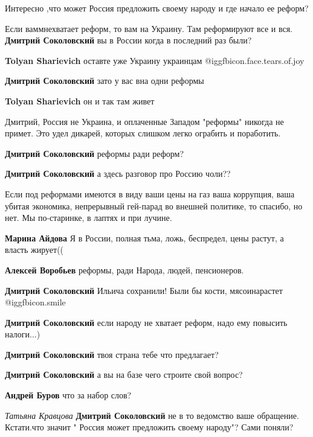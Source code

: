 \begin{itemize} %
Интересно ,что может Россия предложить своему народу и где начало ее реформ?

\begin{itemize} %
Если ваммнехватает реформ, то вам на Украину. Там реформируют все и вся.
\textbf{Дмитрий Соколовский} вы в России когда в последний раз были?

\textbf{Tolyan Sharievich} оставте уже Украину украинцам @igg{fbicon.face.tears.of.joy} 

\textbf{Дмитрий Соколовский} зато у вас вна одни реформы

\textbf{Tolyan Sharievich} он и так там живет

Дмитрий, Россия не Украина, и оплаченные Западом "реформы" никогда не примет. Это удел дикарей, которых слишком легко ограбить и поработить.

\textbf{Дмитрий Соколовский} реформы ради реформ?

\textbf{Дмитрий Соколовский} а здесь разговор про Россию чоли??


Если под реформами имеются в виду ваши цены на газ ваша коррупция, ваша убитая
экономика, непрерывный гей-парад во внешней политике, то спасибо, но нет. Мы
по-старинке, в лаптях и при лучине.

\textbf{Марина Айдова} Я в России, полная тьма, ложь, беспредел, цены растут, а власть жирует((

\textbf{Алексей Воробьев} реформы, ради Народа, людей, пенсионеров.

\textbf{Дмитрий Соколовский} Ильича сохранили!
Были бы кости, мясоинарастет  @igg{fbicon.smile} 

\textbf{Дмитрий Соколовский} если народу не хватает реформ, надо ему повысить налоги...)

\textbf{Дмитрий Соколовский} твоя страна тебе что предлагает?

\textbf{Дмитрий Соколовский} а вы на базе чего строите свой вопрос?

\textbf{Андрей Буров} что за набор слов?

\emph{Татьяна Кравцова}
\textbf{Дмитрий Соколовский} не в то ведомство ваше обращение. Кстати.что значит " Россия может предложить своему народу"? Сами поняли?


\end{itemize}
\end{itemize}
